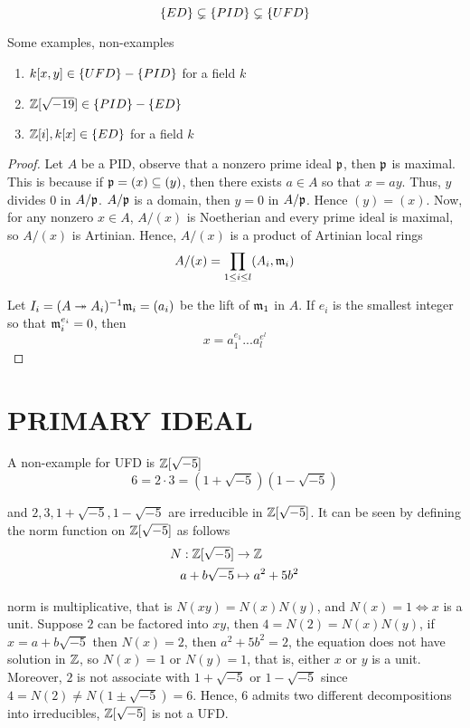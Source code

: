 \begin{proposition}
	$$
		\{ED\} \subsetneq \{PID\} \subsetneq \{UFD\}
	$$
\end{proposition}

\begin{remark}
	Some examples, non-examples
	\begin{enumerate}
		\item $k[x, y] \in \{UFD\} - \{PID\}$ for a field $k$
		\item $\mathbb{Z}[\sqrt{-19}] \in \{PID\} - \{ED\}$
		\item $\mathbb{Z}[i], k[x] \in \{ED\}$ for a field $k$
	\end{enumerate}
\end{remark}

\begin{proof} 
	Let $A$ be a PID, observe that a nonzero prime ideal $\mathfrak{p}$, then $\mathfrak{p}$ is maximal. This is because if $\mathfrak{p} = (x) \subseteq (y)$, then there exists $a \in A$ so that $x = ay$. Thus, $y$ divides $0$ in $A / \mathfrak{p}$. $A / \mathfrak{p}$ is a domain, then $y = 0$ in $A / \mathfrak{p}$. Hence $(y) = (x)$. Now, for any nonzero $x \in A$, $A / (x)$ is Noetherian and every prime ideal is maximal, so $A / (x)$ is Artinian. Hence, $A / (x)$ is a product of Artinian local rings
	$$
		A / (x) = \prod_{1 \leq i \leq l} (A_i, \mathfrak{m}_i)
	$$
	
	Let $I_i = (A \twoheadrightarrow A_i)^{-1} \mathfrak{m}_i = (a_i)$ be the lift of $\mathfrak{m}_1$ in $A$. If $e_i$ is the smallest integer so that $\mathfrak{m}_i^{e_i} = 0$, then 
	$$
		x = a_1^{e_1} ... a_l^{e^l}
	$$
\end{proof}

\section{PRIMARY IDEAL}

A non-example for UFD is $\mathbb{Z}[\sqrt{-5}]$
$$
	6 = 2 \cdot 3 = (1 + \sqrt{-5})(1 - \sqrt{-5})
$$

and $2, 3, 1 + \sqrt{-5}, 1 - \sqrt{-5}$ are irreducible in $\mathbb{Z}[\sqrt{-5}]$. It can be seen by defining the norm function on $\mathbb{Z}[\sqrt{-5}]$ as follows
\begin{align*}
	N: \mathbb{Z}[\sqrt{-5}] &\to \mathbb{Z} \\
	a + b\sqrt{-5} &\mapsto a^2 + 5 b^2
\end{align*}

norm is multiplicative, that is $N(xy) = N(x) N(y)$, and $N(x) = 1 \iff x $ is a unit. Suppose $2$ can be factored into $xy$, then $4 = N(2) = N(x) N(y)$, if $x = a + b\sqrt{-5}$ then $N(x) = 2$, then $a^2 + 5 b^2 = 2$, the equation does not have solution in $\mathbb{Z}$, so $N(x) = 1$ or $N(y) = 1$, that is, either $x$ or $y$ is a unit. Moreover, $2$ is not associate with $1 + \sqrt{-5}$ or $1 - \sqrt{-5}$ since $4 = N(2) \neq N(1 \pm \sqrt{-5}) = 6$. Hence, $6$ admits two different decompositions into irreducibles, $\mathbb{Z}[\sqrt{-5}]$ is not a UFD.

